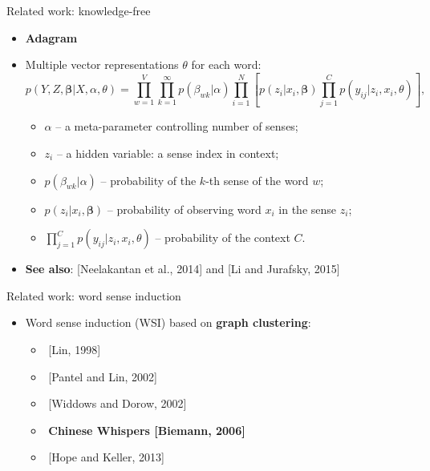 \documentclass{beamer}
\begin{document}
\begin{frame}{Related work: knowledge-free}

\begin{itemize}
\item \textbf{Adagram}~\cite{bartunov2016breaking}
\item Multiple vector representations $\theta$ for each word:
 $$p(Y,Z,\mathbf{\beta}|X,\alpha,\theta) = \prod_{w=1}^{V} \prod_{k=1}^{\infty} p(\beta_{wk}|\alpha) \prod_{i=1}^N [p(z_i|x_i,\mathbf{\beta}) \prod_{j=1}^C p(y_{ij}|z_i,x_i,\theta)],$$ 
\begin{itemize}

\pause 

\item $\alpha$ -- a meta-parameter controlling number of senses;
\item $z_i$ -- a hidden variable: a sense index in context; 
\item $p(\beta_{wk}|\alpha)$ -- probability of the $k$-th sense of the word $w$;
\item $p(z_i|x_i,\mathbf{\beta})$ -- probability of observing word $x_i$ in the sense $z_i$;
\item $\prod_{j=1}^C p(y_{ij}|z_i,x_i,\theta)$ -- probability of the context $C$.
\end{itemize}

\pause 
\item \alert{\textbf{See also}}: [Neelakantan et al., 2014] and [Li and Jurafsky, 2015]

\end{itemize}
	
\end{frame}


\begin{frame}{Related work: word sense induction}

\begin{itemize}
	\item Word sense induction (WSI) based on \alert{\textbf{graph clustering}}:  
	\begin{itemize}
	\item $ $ [Lin, 1998]
	\item $ $ [Pantel and Lin, 2002]
	\item $ $ [Widdows and Dorow, 2002]
	\item $ $ \textbf{Chinese Whispers [Biemann, 2006]}
	\item $ $ [Hope and Keller, 2013]
	\end{itemize}
	
\end{itemize}
	

\end{frame}
\end{document}

